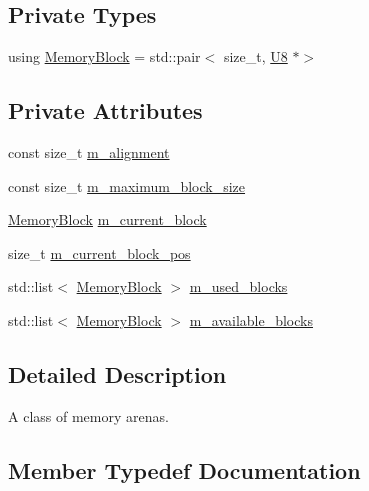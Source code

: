 \subsection*{Private Types}
\begin{DoxyCompactItemize}
\item 
using \hyperlink{classmage_1_1_memory_arena_a51f08f86660f163e2eef7c312e01700c}{Memory\+Block} = std\+::pair$<$ size\+\_\+t, \hyperlink{namespacemage_afc638980bc6154f15af5e2d93a0e0ea9}{U8} $\ast$$>$
\end{DoxyCompactItemize}
\subsection*{Private Attributes}
\begin{DoxyCompactItemize}
\item 
const size\+\_\+t \hyperlink{classmage_1_1_memory_arena_a424c3ff6f1d96545dd08f94c1c79c963}{m\+\_\+alignment}
\item 
const size\+\_\+t \hyperlink{classmage_1_1_memory_arena_aeef4c56cf50fd3cbbba2879fcd028b86}{m\+\_\+maximum\+\_\+block\+\_\+size}
\item 
\hyperlink{classmage_1_1_memory_arena_a51f08f86660f163e2eef7c312e01700c}{Memory\+Block} \hyperlink{classmage_1_1_memory_arena_a2680b25146c174ac7fd639f1bd0acc7c}{m\+\_\+current\+\_\+block}
\item 
size\+\_\+t \hyperlink{classmage_1_1_memory_arena_a880d07eb372ce1c8b907947fcbdfc59c}{m\+\_\+current\+\_\+block\+\_\+pos}
\item 
std\+::list$<$ \hyperlink{classmage_1_1_memory_arena_a51f08f86660f163e2eef7c312e01700c}{Memory\+Block} $>$ \hyperlink{classmage_1_1_memory_arena_a49a6d7fb9396f57210897abfb4e30903}{m\+\_\+used\+\_\+blocks}
\item 
std\+::list$<$ \hyperlink{classmage_1_1_memory_arena_a51f08f86660f163e2eef7c312e01700c}{Memory\+Block} $>$ \hyperlink{classmage_1_1_memory_arena_a02f251a5aafa61d239b4daed3458a654}{m\+\_\+available\+\_\+blocks}
\end{DoxyCompactItemize}


\subsection{Detailed Description}
A class of memory arenas. 

\subsection{Member Typedef Documentation}
\hypertarget{classmage_1_1_memory_arena_a51f08f86660f163e2eef7c312e01700c}{}\label{classmage_1_1_memory_arena_a51f08f86660f163e2eef7c312e01700c} 
